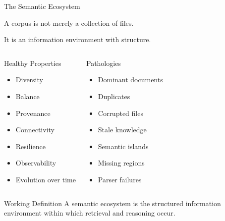 \documentclass[aspectratio=169]{beamer}
\begin{document}
\begin{frame}{The Semantic Ecosystem}

A corpus is not merely a collection of files.

\vspace{0.35cm}

It is an information environment with structure.

\vspace{0.45cm}

\begin{columns}[T]


\begin{block}{Healthy Properties}

\begin{itemize}
\item Diversity
\item Balance
\item Provenance
\item Connectivity
\item Resilience
\item Observability
\item Evolution over time
\end{itemize}

\end{block}


\begin{block}{Pathologies}

\begin{itemize}
\item Dominant documents
\item Duplicates
\item Corrupted files
\item Stale knowledge
\item Semantic islands
\item Missing regions
\item Parser failures
\end{itemize}

\end{block}

\end{columns}

\vspace{0.45cm}

\begin{alertblock}{Working Definition}
A semantic ecosystem is the structured information environment
within which retrieval and reasoning occur.
\end{alertblock}

\end{frame}
\end{document}
